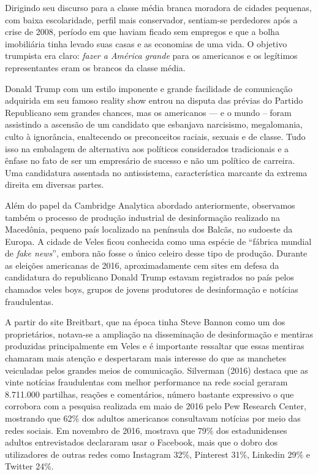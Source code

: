 Dirigindo seu discurso para a classe média branca moradora de cidades
pequenas, com baixa escolaridade, perfil mais conservador, sentiam-se
perdedores após a crise de 2008, período em que haviam ficado sem
empregos e que a bolha imobiliária tinha levado suas casas e as
economias de uma vida. O objetivo trumpista era claro: \textit{fazer a América
grande} para os americanos e os legítimos representantes eram os brancos
da classe média.

Donald Trump com um estilo imponente e grande facilidade de comunicação
adquirida em seu famoso reality show entrou na disputa das prévias do
Partido Republicano sem grandes chances, mas os americanos --- e o mundo
-- foram assistindo a ascensão de um candidato que esbanjava narcisismo,
megalomania, culto à ignorância, enaltecendo os preconceitos raciais,
sexuais e de classe. Tudo isso na embalagem de alternativa aos políticos
considerados tradicionais e a ênfase no fato de ser um empresário de
sucesso e não um político de carreira. Uma candidatura assentada no
antissistema, característica marcante da extrema direita em diversas
partes.

Além do papel da Cambridge Analytica abordado anteriormente, observamos
também o processo de produção industrial de desinformação realizado na
Macedônia, pequeno país localizado na península dos Balcãs, no sudoeste
da Europa. A cidade de Veles ficou conhecida como uma espécie de
``fábrica mundial de \textit{fake news}'', embora não fosse o único
celeiro desse tipo de produção. Durante as eleições americanas de 2016,
aproximadamente cem sites em defesa da candidatura do republicano Donald
Trump estavam registrados no país pelos chamados veles boys, grupos de
jovens produtores de desinformação e notícias fraudulentas.

A partir do site Breitbart, que na época tinha Steve Bannon como um dos
proprietários, notava-se a ampliação na disseminação de desinformação e
mentiras produzidas principalmente em Veles e é importante ressaltar que
essas mentiras chamaram mais atenção e despertaram mais interesse do que
as manchetes veiculadas pelos grandes meios de comunicação. Silverman
(2016) destaca que as vinte notícias fraudulentas com melhor performance
na rede social geraram 8.711.000 partilhas, reações e comentários,
número bastante expressivo o que corrobora com a pesquisa realizada em
maio de 2016 pelo Pew Research Center, mostrando que 62\% dos adultos
americanos consultavam notícias por meio das redes sociais. Em novembro
de 2016, mostrava que 79\% dos estadunidenses adultos entrevistados
declararam usar o Facebook, mais que o dobro dos utilizadores de outras
redes como Instagram 32\%, Pinterest 31\%, Linkedin 29\% e Twitter 24\%.

